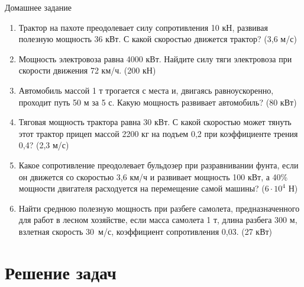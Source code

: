 \documentclass[a5paper, 10pt]{diss_4}
\renewcommand{\'}{\,'}
\begin{document}
\begin{center}
   Домашнее задание
\end{center}
\begin{enumerate}

\item Трактор на пахоте преодолевает силу сопротивления 10 кН, развивая полезную мощность 36 кВт. С какой скоростью движется трактор? (3,6 м/с)

\item Мощность электровоза равна 4000 кВт. Найдите силу тяги электровоза при скорости движения 72 км/ч. (200 кН)

\item Автомобиль массой 1 т трогается с места и, двигаясь равноускоренно, проходит путь 50 м за 5 с. Какую мощность развивает автомобиль? (80 кВт)


\item Тяговая мощность трактора равна 30 кВт. С какой скоростью может тянуть этот трактор прицеп массой 2200 кг на подъем 0,2 при коэффициенте трения 0,4? (2,3 м/с)

\item Какое сопротивление преодолевает бульдозер при разравнивании фунта, если он движется со скоростью 3,6 км/ч и развивает мощность 100 кВт, а 40\% мощности двигателя расходуется на перемещение самой машины? ($6\cdot10^4$ Н)

\item Найти среднюю полезную мощность при разбеге самолета, предназначенного для работ в лесном хозяйстве, если масса самолета 1 т, длина разбега 300 м, взлетная скорость 30 м/с, коэффициент сопротивления 0,03. (27 кВт)

\end{enumerate}


\section{Решение задач}
\end{document}
